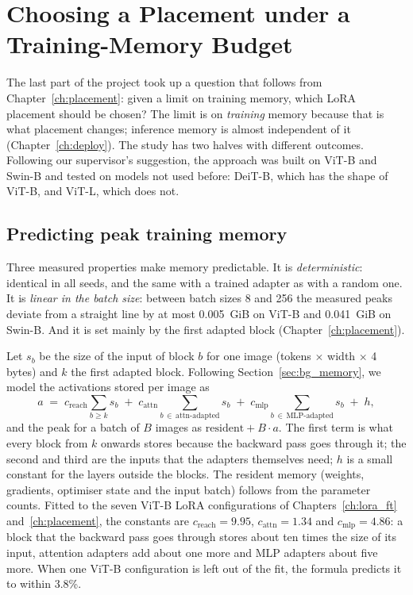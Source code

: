 \chapter{Choosing a Placement under a Training-Memory Budget}
\label{ch:budget}

The last part of the project took up a question that follows from Chapter~\ref{ch:placement}: given a limit on
training memory, which LoRA placement should be chosen? The limit is on \emph{training} memory because that is what
placement changes; inference memory is almost independent of it (Chapter~\ref{ch:deploy}). The study has two halves
with different outcomes. Following our supervisor's suggestion, the approach was built on ViT-B and Swin-B and
tested on models not used before: DeiT-B, which has the shape of ViT-B, and ViT-L, which does not.

\section{Predicting peak training memory}

Three measured properties make memory predictable. It is \emph{deterministic}: identical in all seeds, and the same
with a trained adapter as with a random one. It is \emph{linear in the batch size}: between batch sizes 8 and 256
the measured peaks deviate from a straight line by at most 0.005~GiB on ViT-B and 0.041~GiB on Swin-B. And it is set
mainly by the first adapted block (Chapter~\ref{ch:placement}).

Let $s_b$ be the size of the input of block $b$ for one image (tokens $\times$ width $\times$ 4 bytes) and $k$ the
first adapted block. Following Section~\ref{sec:bg_memory}, we model the activations stored per image as
\begin{equation}
  a \;=\; c_\text{reach} \sum_{b \ge k} s_b \;+\; c_\text{attn} \!\!\sum_{b \,\in\, \text{attn-adapted}}\!\! s_b
        \;+\; c_\text{mlp} \!\!\sum_{b \,\in\, \text{MLP-adapted}}\!\! s_b \;+\; h ,
  \label{eq:mem}
\end{equation}
and the peak for a batch of $B$ images as $\text{resident} + B \cdot a$. The first term is what every block from $k$
onwards stores because the backward pass goes through it; the second and third are the inputs that the adapters
themselves need; $h$ is a small constant for the layers outside the blocks. The resident memory (weights,
gradients, optimiser state and the input batch) follows from the parameter counts. Fitted to the seven ViT-B LoRA
configurations of Chapters~\ref{ch:lora_ft} and~\ref{ch:placement}, the constants are $c_\text{reach} = 9.95$,
$c_\text{attn} = 1.34$ and $c_\text{mlp} = 4.86$: a block that the backward pass goes through stores about ten times
the size of its input, attention adapters add about one more and MLP adapters about five more. When one ViT-B
configuration is left out of the fit, the formula predicts it to within 3.8\%.

